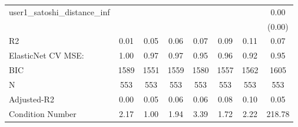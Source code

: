\begin{table}
\begin{center}
\begin{tabular}{lccccccc}
user1_satoshi_distance_inf                     &          &            &         &         &          &                    & 0.00     \\
                                               &          &            &         &         &          &                    & (0.00)   \\
R2                                             & 0.01     & 0.05       & 0.06    & 0.07    & 0.09     & 0.11               & 0.07     \\
ElasticNet CV MSE:                             & 1.00     & 0.97       & 0.97    & 0.95    & 0.96     & 0.92               & 0.95     \\
BIC                                            & 1589     & 1551       & 1559    & 1580    & 1557     & 1562               & 1605     \\
N                                              & 553      & 553        & 553     & 553     & 553      & 553                & 553      \\
Adjusted-R2                                    & 0.00     & 0.05       & 0.06    & 0.06    & 0.08     & 0.10               & 0.05     \\
Condition Number                               & 2.17     & 1.00       & 1.94    & 3.39    & 1.72     & 2.22               & 218.78   \\
\hline
\end{tabular}
\end{center}
\end{table}
